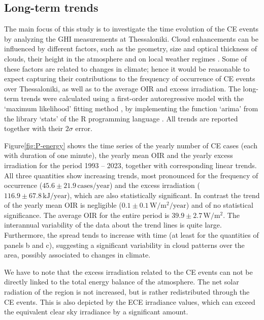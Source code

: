 \documentclass[preprint, 5p,
authoryear]{elsarticle} %
\begin{document}
\subsection{Long-term trends}\label{long-term-trends}

The main focus of this study is to investigate the time evolution of the
CE events by analyzing the GHI measurements at Thessaloniki. Cloud
enhancements can be influenced by different factors, such as the
geometry, size and optical thickness of clouds, their height in the
atmosphere and on local weather regimes
\citep{Mol2023, Veerman2022, Gristey2022, Tzoumanikas2016}. Some of
these factors are related to changes in climate; hence it would be
reasonable to expect capturing their contributions to the frequency of
occurrence of CE events over Thessaloniki, as well as to the average OIR
and excess irradiation. The long-term trends were calculated using a
first-order autoregressive model with the `maximum likelihood' fitting
method \citep{Gardner1980, Jones1980}, by implementing the function
`arima' from the library `stats' of the R programming language
\citep{RCT2023}. All trends are reported together with their \(2\sigma\)
error.

Figure\nobreakspace{}\ref{fig:P-energy} shows the time series of the
yearly number of CE cases (each with duration of one minute), the yearly
mean OIR and the yearly excess irradiation for the period 1993 -- 2023,
together with corresponding linear trends. All three quantities show
increasing trends, most pronounced for the frequency of occurrence
(\(45.6\pm 21.9\,\text{cases}/\text{year}\)) and the excess irradiation
(\(116.9 \pm 67.8\,\text{kJ}/\text{year}\)), which are also
statistically significant. In contrast the trend of the yearly mean OIR
is negligible (\(0.1\pm 0.1\,\text{W}/\text{m}^2/\text{year}\)) and of
no statistical significance. The average OIR for the entire period is
\(39.9\pm 2.7\,\text{W}/\text{m}^2\). The interannual variability of the
data about the trend lines is quite large. Furthermore, the spread tends
to increase with time (at least for the quantities of panels b and c),
suggesting a significant variability in cloud patterns over the area,
possibly associated to changes in climate.

We have to note that the excess irradiation related to the CE events can
not be directly linked to the total energy balance of the atmosphere.
The net solar radiation of the region is not increased, but is rather
redistributed through the CE events. This is also depicted by the ECE
irradiance values, which can exceed the equivalent clear sky irradiance
by a significant amount.
\end{document}

